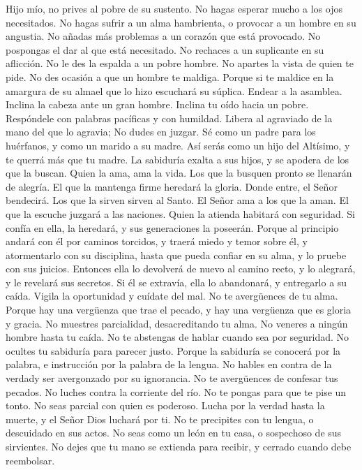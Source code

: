  Hijo mío, no prives al pobre de su sustento. No hagas
esperar mucho a los ojos necesitados.  No hagas sufrir a
un alma hambrienta, o provocar a un hombre en su angustia.
 No añadas más problemas a un corazón que está provocado.
No pospongas el dar al que está necesitado.  No rechaces a
un suplicante en su aflicción. No le des la espalda a un pobre hombre.
 No apartes la vista de quien te pide. No des ocasión a
que un hombre te maldiga.  Porque si te maldice en la
amargura de su almael que lo hizo escuchará su súplica. 
Endear a la asamblea. Inclina la cabeza ante un gran hombre.
 Inclina tu oído hacia un pobre. Respóndele con palabras
pacíficas y con humildad.  Libera al agraviado de la mano
del que lo agravia; No dudes en juzgar.  Sé como un padre
para los huérfanos, y como un marido a su madre. Así serás como un hijo
del Altísimo, y te querrá más que tu madre.  La sabiduría
exalta a sus hijos, y se apodera de los que la buscan. 
Quien la ama, ama la vida. Los que la busquen pronto se llenarán de
alegría.  El que la mantenga firme heredará la gloria.
Donde entre, el Señor bendecirá.  Los que la sirven
sirven al Santo. El Señor ama a los que la aman.  El que
la escuche juzgará a las naciones. Quien la atienda habitará con
seguridad.  Si confía en ella, la heredará, y sus
generaciones la poseerán.  Porque al principio andará con
él por caminos torcidos, y traerá miedo y temor sobre él, y atormentarlo
con su disciplina, hasta que pueda confiar en su alma, y lo pruebe con
sus juicios.  Entonces ella lo devolverá de nuevo al
camino recto, y lo alegrará, y le revelará sus secretos. 
Si él se extravía, ella lo abandonará, y entregarlo a su caída.
 Vigila la oportunidad y cuídate del mal. No te
avergüences de tu alma.  Porque hay una vergüenza que
trae el pecado, y hay una vergüenza que es gloria y gracia.
 No muestres parcialidad, desacreditando tu alma. No
veneres a ningún hombre hasta tu caída.  No te abstengas
de hablar cuando sea por seguridad. No ocultes tu sabiduría para parecer
justo.  Porque la sabiduría se conocerá por la palabra, e
instrucción por la palabra de la lengua.  No hables en
contra de la verdady ser avergonzado por su ignorancia. 
No te avergüences de confesar tus pecados. No luches contra la corriente
del río.  No te pongas para que te pise un tonto. No seas
parcial con quien es poderoso.  Lucha por la verdad hasta
la muerte, y el Señor Dios luchará por ti.  No te
precipites con tu lengua, o descuidado en sus actos.  No
seas como un león en tu casa, o sospechoso de sus sirvientes.
 No dejes que tu mano se extienda para recibir, y cerrado
cuando debe reembolsar.

